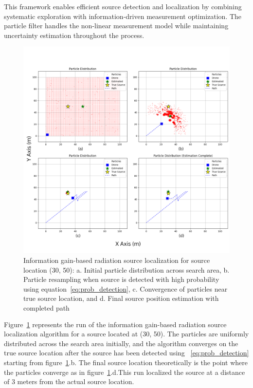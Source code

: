\documentclass[../report.tex]{subfiles}
\begin{document}
    This framework enables efficient source detection and localization by combining systematic exploration with information-driven measurement optimization. The particle filter handles the 
    non-linear measurement model while maintaining uncertainty estimation throughout the process.

    \begin{figure}[ht]
        \centering
        \includegraphics[width=\linewidth]{figures/entropy_algorithm_with_label.png}
        \caption{Information gain-based radiation source localization for source location (30, 50): a. Initial particle distribution across search area, 
        b. Particle resampling when source is detected with high probability using equation~\ref{eq:prob_detection}, 
        c. Convergence of particles near true source location, and 
        d. Final source position estimation with completed path}
        \label{fig:entropy_algorithm_with_plot}
    \end{figure}

    Figure~\ref{fig:entropy_algorithm_with_plot} represents the run of the information gain-based radiation source localization algorithm for a source located at (30, 50). The 
    particles are uniformly distributed across the search area initially, and the algorithm converges on the true source location after the source has been detected using ~\ref{eq:prob_detection} starting 
    from figure~\ref{fig:entropy_algorithm_with_plot}.b. The final source location theoretically is the point where the  particles converge as in figure~\ref{fig:entropy_algorithm_with_plot}.d.This 
    run localized the source at a distance of 3 meters from the actual source location.
\end{document}
